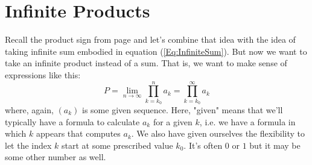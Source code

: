 \section{Infinite Products}
Recall the product sign from page \pageref{Sec:SumsAndProducts} and let's combine that idea with the idea of taking infinite sum embodied in equation (\ref{Eq:InfiniteSum}). But now we want to take an infinite product instead of a sum. That is, we want to make sense of expressions like this:
\begin{equation}
\label{Eq:InfiniteProduct}
P = \lim_{n \rightarrow \infty} \prod_{k=k_0}^n a_k
  = \prod_{k=k_0}^{\infty} a_k
\end{equation}
where, again, $(a_k)$ is some given sequence. Here, "given" means that we'll typically have a formula to calculate $a_k$ for a given $k$, i.e. we have a formula in which $k$ appears that computes $a_k$. We also have given ourselves the flexibility to let the index $k$ start at some prescribed value $k_0$. It's often $0$ or $1$ but it may be some other number as well. 



